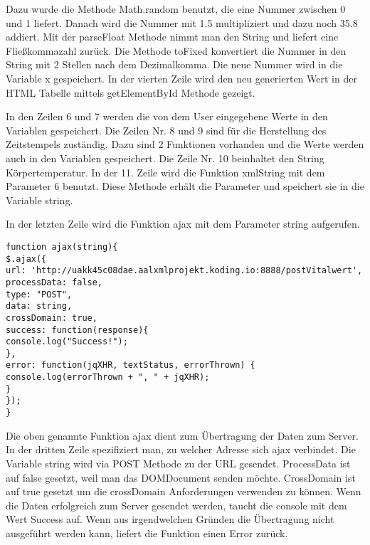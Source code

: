 Dazu wurde die Methode Math.random benutzt, die eine Nummer zwischen 0 und 1 liefert. Danach wird die Nummer mit 1.5 multipliziert und dazu noch 35.8 addiert. Mit der parseFloat Methode nimmt man den String und liefert eine Fließkommazahl zurück.  Die Methode toFixed konvertiert die Nummer in den String mit 2 Stellen nach dem Dezimalkomma. Die neue Nummer wird in die Variable x gespeichert. In der vierten Zeile wird den neu generierten Wert in der HTML Tabelle mittels getElementById Methode gezeigt.

In den Zeilen 6 und 7 werden die von dem User eingegebene Werte in den Variablen gespeichert. Die Zeilen Nr. 8 und 9 sind für die Herstellung des Zeitstempels zuständig. Dazu sind 2 Funktionen vorhanden und die Werte werden auch in den Variablen gespeichert. Die Zeile Nr. 10 beinhaltet den String Körpertemperatur. In der 11. Zeile wird die Funktion xmlString mit dem Parameter 6 benutzt. Diese Methode erhält die Parameter und speichert sie in die Variable string.

In der letzten Zeile wird die Funktion ajax mit dem Parameter string aufgerufen.
\\
\begin{lstlisting}
function ajax(string){
$.ajax({
url: 'http://uakk45c08dae.aalxmlprojekt.koding.io:8888/postVitalwert', 
processData: false,
type: "POST",
data: string,
crossDomain: true,
success: function(response){
console.log("Success!");
},
error: function(jqXHR, textStatus, errorThrown) {
console.log(errorThrown + ", " + jqXHR);
}
});
}
\end{lstlisting}

Die oben genannte Funktion ajax dient zum Übertragung der Daten zum Server. In der dritten Zeile spezifiziert man, zu welcher Adresse sich ajax verbindet. Die Variable string wird via POST Methode zu der URL gesendet. ProcessData ist auf false gesetzt, weil man das DOMDocument senden möchte. CrossDomain ist auf true gesetzt um die crossDomain Anforderungen verwenden zu können. Wenn die Daten erfolgreich zum Server gesendet werden, taucht die console mit dem Wert Success auf. Wenn aus irgendwelchen Gründen die Übertragung nicht ausgeführt werden kann, liefert die Funktion einen Error zurück.   
     
